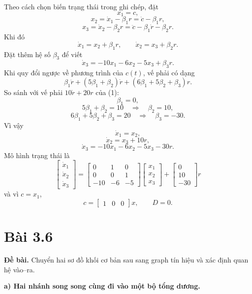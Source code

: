 \documentclass[11pt,a4paper]{article}
\newcommand{\baitap}[1]{%
  \Needspace{4\baselineskip}%
  \section*{Bài #1}%
}
\newcommand{\debai}{\par\noindent\textbf{Đề bài.}\enspace}
\begin{document}
Theo cách chọn biến trạng thái trong ghi chép, đặt
\[
x_1=c,
\]
\[
x_2=\dot x_1-\beta_1r
=\dot c-\beta_1r,
\]
\[
x_3=\dot x_2-\beta_2r
=\ddot c-\beta_1\dot r-\beta_2r.
\]
Khi đó
\[
\dot x_1=x_2+\beta_1r,
\qquad
\dot x_2=x_3+\beta_2r.
\]
Đặt thêm hệ số \(\beta_3\) để viết
\[
\dot x_3
=-10x_1-6x_2-5x_3+\beta_3r.
\]
Khi quy đổi ngược về phương trình của \(c(t)\), vế phải có dạng
\[
\beta_1\ddot r
+(5\beta_1+\beta_2)\dot r
+(6\beta_1+5\beta_2+\beta_3)r.
\]
So sánh với vế phải \(10\dot r+20r\) của (1):
\[
\beta_1=0,
\]
\[
5\beta_1+\beta_2=10
\quad\Rightarrow\quad
\beta_2=10,
\]
\[
6\beta_1+5\beta_2+\beta_3=20
\quad\Rightarrow\quad
\beta_3=-30.
\]
Vì vậy
\[
\dot x_1=x_2,
\]
\[
\dot x_2=x_3+10r,
\]
\[
\dot x_3=-10x_1-6x_2-5x_3-30r.
\]
Mô hình trạng thái là
\[
\boxed{
\begin{bmatrix}
\dot x_1\\
\dot x_2\\
\dot x_3
\end{bmatrix}
=
\begin{bmatrix}
0&1&0\\
0&0&1\\
-10&-6&-5
\end{bmatrix}
\begin{bmatrix}
x_1\\
x_2\\
x_3
\end{bmatrix}
+
\begin{bmatrix}
0\\
10\\
-30
\end{bmatrix}r
}
\]
và vì \(c=x_1\),
\[
\boxed{
c=
\begin{bmatrix}
1&0&0
\end{bmatrix}x,
\qquad D=0.}
\]


\baitap{3.6}
\debai
Chuyển hai sơ đồ khối cơ bản sau sang graph tín hiệu và xác định quan hệ vào--ra.

\textbf{a) Hai nhánh song song cùng đi vào một bộ tổng dương.}

\begin{center}
\qquad
{}
\end{center}
\end{document}
